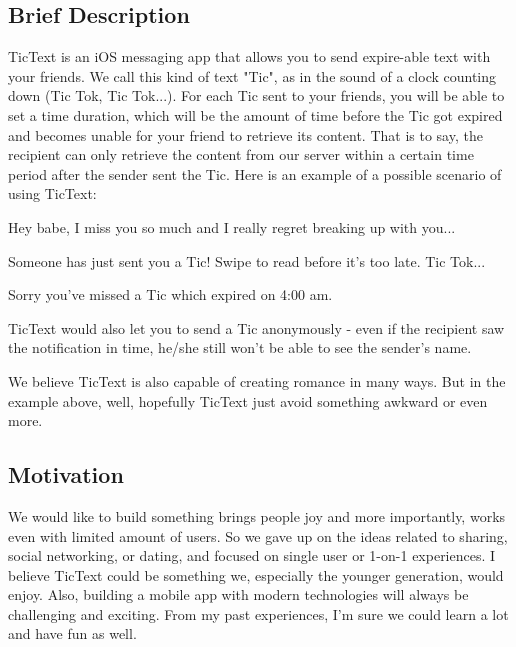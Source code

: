 \subsection{Brief Description}
TicText is an iOS messaging app that allows you to send expire-able text with your friends. We call this kind of text "Tic", as in the sound of a clock counting down (Tic Tok, Tic Tok...). For each Tic sent to your friends, you will be able to set a time duration, which will be the amount of time before the Tic got expired and becomes unable for your friend to retrieve its content. That is to say, the recipient can only retrieve the content from our server within a certain time period after the sender sent the Tic. Here is an example of a possible scenario of using TicText:

\begin{dialogue}
	 
	
		\medskip
		Hey babe, I miss you so much and I really regret breaking up with you...
	
		\medskip
	 Someone has just sent you a Tic! Swipe to read before it's too late. Tic Tok...
	
		\medskip
	 Sorry you've missed a Tic which expired on 4:00 am.
\end{dialogue}

TicText would also let you to send a Tic anonymously - even if the recipient saw the notification in time, he/she still won't be able to see the sender's name.

We believe TicText is also capable of creating romance in many ways. But in the example above, well, hopefully TicText just avoid something awkward or even more. 
\subsection{Motivation}
We would like to build something brings people joy and more importantly, works even with limited amount of users. So we gave up on the ideas related to sharing, social networking, or dating, and focused on single user or 1-on-1 experiences. I believe TicText could be something we, especially the younger generation, would enjoy. Also, building a mobile app with modern technologies will always be challenging and exciting. From my past experiences, I'm sure we could learn a lot and have fun as well. 

